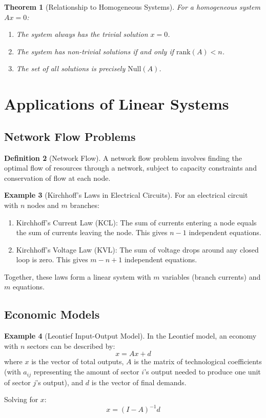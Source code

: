 \documentclass[12pt,a4paper]{article}
\theoremstyle{plain}
\newtheorem{theorem}{Theorem}[section]
\theoremstyle{definition}
\newtheorem{definition}[theorem]{Definition}
\newtheorem{example}[theorem]{Example}
\begin{document}
\begin{theorem}[Relationship to Homogeneous Systems]
For a homogeneous system $Ax = 0$:
\begin{enumerate}[label=(\roman*)]
\item The system always has the trivial solution $x = 0$.
\item The system has non-trivial solutions if and only if $\text{rank}(A) < n$.
\item The set of all solutions is precisely $\text{Null}(A)$.
\end{enumerate}
\end{theorem}

\section{Applications of Linear Systems}

\subsection{Network Flow Problems}

\begin{definition}[Network Flow]
A network flow problem involves finding the optimal flow of resources through a network, subject to capacity constraints and conservation of flow at each node.
\end{definition}

\begin{example}[Kirchhoff's Laws in Electrical Circuits]
For an electrical circuit with $n$ nodes and $m$ branches:
\begin{enumerate}[label=(\roman*)]
\item Kirchhoff's Current Law (KCL): The sum of currents entering a node equals the sum of currents leaving the node. This gives $n-1$ independent equations.
\item Kirchhoff's Voltage Law (KVL): The sum of voltage drops around any closed loop is zero. This gives $m-n+1$ independent equations.
\end{enumerate}
Together, these laws form a linear system with $m$ variables (branch currents) and $m$ equations.
\end{example}

\subsection{Economic Models}

\begin{example}[Leontief Input-Output Model]
In the Leontief model, an economy with $n$ sectors can be described by:
\begin{equation}
x = Ax + d
\end{equation}
where $x$ is the vector of total outputs, $A$ is the matrix of technological coefficients (with $a_{ij}$ representing the amount of sector $i$'s output needed to produce one unit of sector $j$'s output), and $d$ is the vector of final demands.

Solving for $x$:
\begin{equation}
x = (I - A)^{-1} d
\end{equation}
\end{example}
\end{document}
